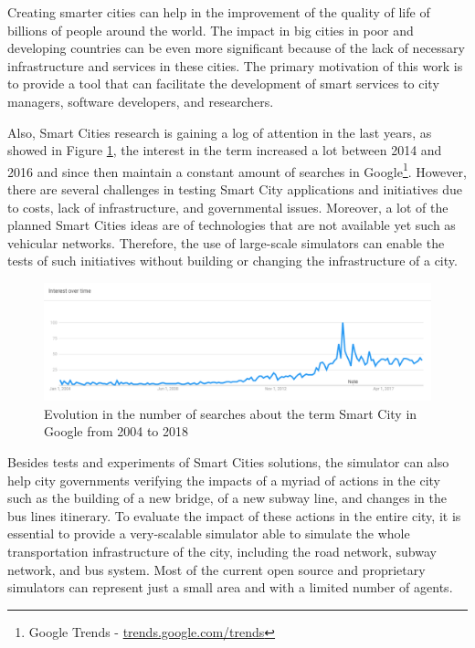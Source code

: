 Creating smarter cities can help in the improvement of the quality of life of billions of people around the world. The impact in big cities in poor and developing countries can be even more significant because of the lack of necessary infrastructure and services in these cities. The primary motivation of this work is to provide a tool that can facilitate the development of smart services to city managers, software developers, and researchers.  

Also, Smart Cities research is gaining a log of attention in the last years, as showed in Figure \ref{fig:trends}, the interest in the term increased a lot between 2014 and 2016 and since then maintain a constant amount of searches in Google\footnote{Google Trends - \url{trends.google.com/trends}}. However, there are several challenges in testing Smart City applications and initiatives due to costs, lack of infrastructure, and governmental issues. Moreover, a lot of the planned Smart Cities ideas are of technologies that are not available yet such as vehicular networks. Therefore, the use of large-scale simulators can enable the tests of such initiatives without building or changing the infrastructure of a city.

\begin{figure}[!htb]
\centering
\includegraphics[width=1\textwidth]{figuras/chap-introduction/trends.png}
\caption{Evolution in the number of searches about the term Smart City in Google from 2004 to 2018}
\label{fig:trends}
\end{figure}

Besides tests and experiments of Smart Cities solutions, the simulator can also help city governments verifying the impacts of a myriad of actions in the city such as the building of a new bridge, of a new subway line, and changes in the bus lines itinerary. To evaluate the impact of these actions in the entire city, it is essential to provide a very-scalable simulator able to simulate the whole transportation infrastructure of the city, including the road network, subway network, and bus system. Most of the current open source and proprietary simulators can represent just a small area and with a limited number of agents. 
